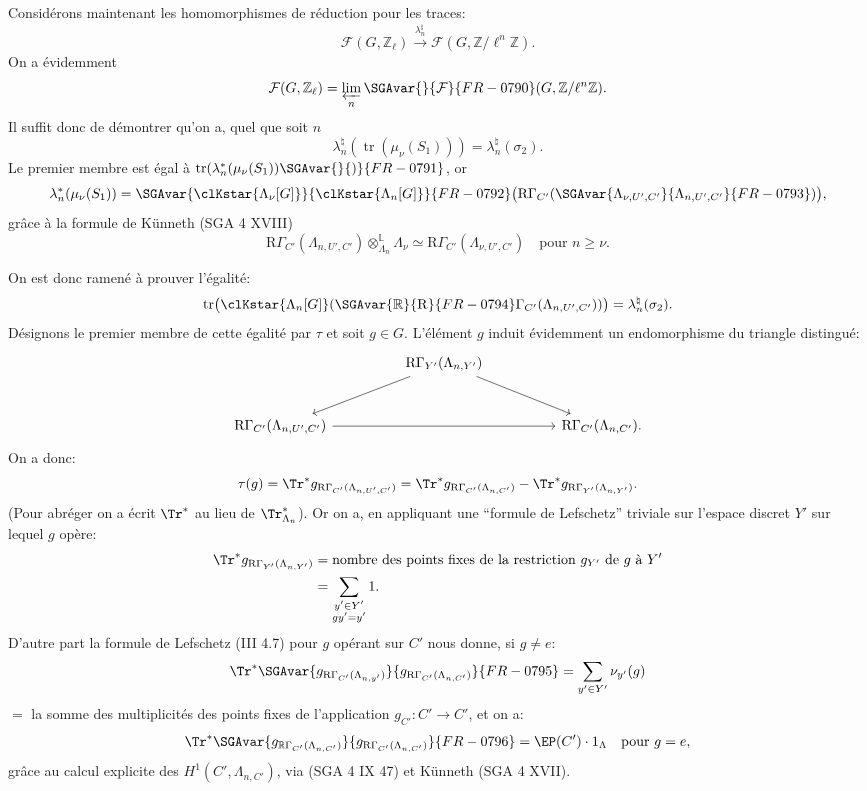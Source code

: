 Considérons maintenant les homomorphismes de réduction pour les traces:
\[
\mathcal{F}(G,\mathbb{Z}_\ell)\xrightarrow{\lambda_n^\natural}\mathcal{F}(G,\mathbb{Z}/\ell^n\mathbb{Z}).
\]
On a évidemment
\[
\mathcal{F}(G,\mathbb{Z}_\ell)=\varprojlim_n\SGAvar{}{\mathcal{F}}{FR-0790}(G,\mathbb{Z}/\ell^n\mathbb{Z}).
\]
Il suffit donc de démontrer qu'on a, quel que soit $n$
\[
\lambda_n^\natural(\operatorname{tr}(\mu_\nu(S_1)))=\lambda_n^\natural(\sigma_2).
\]
Le premier membre est égal à $\operatorname{tr}(\lambda_n^*(\mu_\nu(S_1))\SGAvar{}{)}{FR-0791}$, or
\[
\lambda_n^*(\mu_\nu(S_1))
=
\SGAvar{\clKstar{\Lambda_\nu[G]}}{\clKstar{\Lambda_n[G]}}{FR-0792}\bigl(\mathrm{R}\Gamma_{C'}(\SGAvar{\Lambda_{\nu,U',C'}}{\Lambda_{n,U',C'}}{FR-0793})\bigr),
\]
grâce à la formule de Künneth (SGA 4 XVIII)
\[
\mathrm{R}\Gamma_{C'}(\Lambda_{n,U',C'})\otimes_{\Lambda_n}^{\mathbb{L}}\Lambda_\nu
\simeq \mathrm{R}\Gamma_{C'}(\Lambda_{\nu,U',C'})
\quad\text{pour } n\ge\nu.
\]

On est donc ramené à prouver l'égalité:
\[
\operatorname{tr}\bigl(\clKstar{\Lambda_n[G]}(\SGAvar{\mathbb{R}}{\mathrm{R}}{FR-0794}\Gamma_{C'}(\Lambda_{n,U',C'}))\bigr)
=
\lambda_n^\natural(\sigma_2).
\]
Désignons le premier membre de cette égalité par $\tau$ et soit $g\in G$. L'élément $g$ induit évidemment un endomorphisme du triangle distingué:
\[
\begin{tikzcd}[column sep=huge,row sep=large]
& \mathrm{R}\Gamma_{Y'}(\Lambda_{n,Y'}) \arrow[dl] \arrow[dr] & \\
\mathrm{R}\Gamma_{C'}(\Lambda_{n,U',C'}) \arrow[rr] && \mathrm{R}\Gamma_{C'}(\Lambda_{n,C'}).
\end{tikzcd}
\]
On a donc:
\[
\tau(g)=\Tr^*g_{\mathrm{R}\Gamma_{C'}(\Lambda_{n,U',C'})}
=\Tr^*g_{\mathrm{R}\Gamma_{C'}(\Lambda_{n,C'})}
-\Tr^*g_{\mathrm{R}\Gamma_{Y'}(\Lambda_{n,Y'})}.
\]
(Pour abréger on a écrit $\Tr^*$ au lieu de $\Tr^*_{\Lambda_n}$). Or on a, en appliquant une ``formule de Lefschetz'' triviale sur l'espace discret $Y'$ sur lequel $g$ opère:
\[
\begin{aligned}
\Tr^*g_{\mathrm{R}\Gamma_{Y'}(\Lambda_{n,Y'})}
&=\text{nombre des points fixes de la restriction } g_{Y'} \text{ de } g \text{ à } Y'\\
&=\sum_{\substack{y'\in Y'\\gy'=y'}}1.
\end{aligned}
\]
D'autre part la formule de Lefschetz (III 4.7) pour $g$ opérant sur $C'$ nous donne, si $g\ne e$:
\[
\Tr^*\SGAvar{g_{\mathrm{R}\Gamma_{C'}(\Lambda_{n,y'})}}{g_{\mathrm{R}\Gamma_{C'}(\Lambda_{n,C'})}}{FR-0795}
=
\sum_{y'\in Y'} \nu_{y'}(g)
\]
$=$ la somme des multiplicités des points fixes de l'application $g_{C'}:C'\to C'$, et on a:
\[
\Tr^*\SGAvar{g_{\mathbb{R}\Gamma_{C'}(\Lambda_{n,C'})}}{g_{\mathrm{R}\Gamma_{C'}(\Lambda_{n,C'})}}{FR-0796}=\EP(C')\cdot1_\Lambda
\quad\text{pour }g=e,
\]
grâce au calcul explicite des $H^1(C',\Lambda_{n,C'})$, via (SGA 4 IX 47) et
Künneth (SGA 4 XVII).

